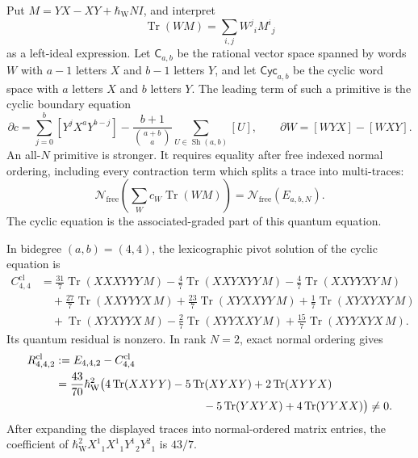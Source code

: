 \begin{stmt}
\label{stmt:app-quantum-shear-trace-diagram-obstruction}
  Put \(M=YX-XY+\hbar_{\mathrm{W}} N I\), and interpret
  \[
    \operatorname{Tr}(W M)=\sum_{i,j}W^j{}_iM^i{}_j
  \]
  as a left-ideal expression.  Let \(\mathsf C_{a,b}\) be the rational
  vector space spanned by words \(W\) with \(a-1\) letters \(X\) and
  \(b-1\) letters \(Y\), and let \(\mathsf{Cyc}_{a,b}\) be the cyclic
  word space with \(a\) letters \(X\) and \(b\) letters \(Y\).  The
  leading term of such a primitive is the cyclic boundary equation
  \[
    \partial c=
    \sum_{j=0}^b[Y^jX^aY^{b-j}]
    -\frac{b+1}{\binom{a+b}{a}}
      \sum_{U\in \operatorname{Sh}(a,b)}[U],
    \qquad
    \partial W=[WYX]-[WXY].
  \]
  An all-\(N\) primitive is stronger.  It requires equality after free
  indexed normal ordering, including every contraction term which splits
  a trace into multi-traces:
  \[
    \mathcal N_{\mathrm{free}}\!\left(
      \sum_W c_W\operatorname{Tr}(W M)\right)
    =
    \mathcal N_{\mathrm{free}}(E_{a,b,N}).
  \]
  The cyclic equation is the associated-graded part of this quantum
  equation.

  In bidegree \((a,b)=(4,4)\), the lexicographic pivot solution of the
  cyclic equation is
  \[
  \begin{aligned}
    C^{\mathrm{cl}}_{4,4}
    &=
      \frac{31}{7}\operatorname{Tr}(XXXYYY\,M)
      -\frac{4}{7}\operatorname{Tr}(XXYXYY\,M)
      -\frac{4}{7}\operatorname{Tr}(XXYYXY\,M)\\
    &\quad
      +\frac{27}{7}\operatorname{Tr}(XXYYYX\,M)
      +\frac{23}{7}\operatorname{Tr}(XYXXYY\,M)
      +\frac{1}{7}\operatorname{Tr}(XYXYXY\,M)\\
    &\quad
      +\operatorname{Tr}(XYXYYX\,M)
      -\frac{2}{7}\operatorname{Tr}(XYYXXY\,M)
      +\frac{15}{7}\operatorname{Tr}(XYYXYX\,M).
  \end{aligned}
  \]
  Its quantum residual is nonzero.  In rank \(N=2\), exact normal
  ordering gives
  \[
  \begin{aligned}
    R^{\mathrm{cl}}_{4,4,2}
    &:=
      E_{4,4,2}-C^{\mathrm{cl}}_{4,4}\\
    &=
      \frac{43}{70}\hbar_{\mathrm{W}}^2\bigl(
        4\operatorname{Tr}(XXYY)-5\operatorname{Tr}(XYXY)
        +2\operatorname{Tr}(XYYX)\\
    &\hspace{4.6cm}
        -5\operatorname{Tr}(YXYX)
        +4\operatorname{Tr}(YYXX)
      \bigr)\neq0 .
  \end{aligned}
  \]
  After expanding the displayed traces into normal-ordered matrix
  entries, the coefficient of
  \(\hbar_{\mathrm{W}}^2X^1{}_1X^1{}_1Y^1{}_2Y^2{}_1\) is \(43/7\).


\end{stmt}
